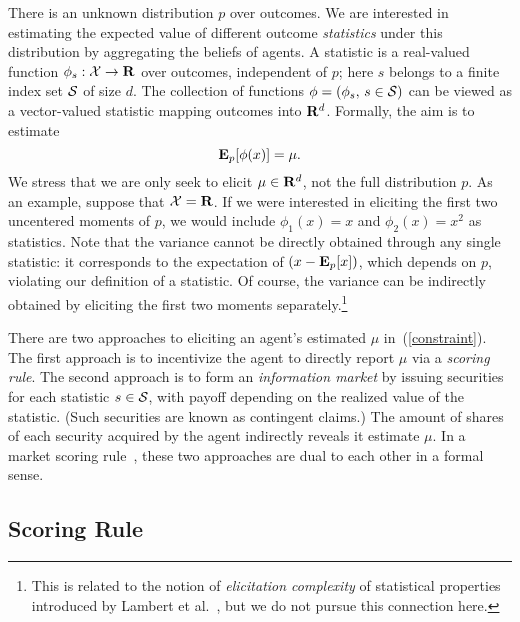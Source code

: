 There is an unknown distribution $p$ over outcomes. We are interested in estimating the expected value of different outcome \emph{statistics} under this distribution by aggregating the beliefs of agents. A statistic is a real-valued function $\phi_s : \mathcal{X} \rightarrow \mathbf{R}$ over outcomes, independent of $p$; here $s$ belongs to a finite index set $\mathcal{S}$ of size $d$. The collection of functions $\phi = (\phi_s,\, s \in \mathcal{S})$ can be viewed as a vector-valued statistic mapping outcomes into $\mathbf{R}^d$. Formally, the aim is to estimate
%
\begin{equation} \label{constraint}
\mathbf{E}_p[\phi(x)] = \mu.
\end{equation}
%
We stress that we are only seek to elicit $\mu \in \mathbf{R}^d$, not the full distribution $p$. As an example, suppose that $\mathcal{X} = \mathbf{R}$. If we were interested in eliciting the first two uncentered moments of $p$, we would include $\phi_1(x) = x$ and $\phi_2(x) = x^2$ as statistics. Note that the variance cannot be directly obtained through any single statistic: it corresponds to the expectation of $(x - \mathbf{E}_p[x])$, which depends on $p$, violating our definition of a statistic. Of course, the variance can be indirectly obtained by eliciting the first two moments separately.\footnote{This is related to the notion of \emph{elicitation complexity} of statistical properties introduced by Lambert et al.~\cite{Lambert}, but we do not pursue this connection here.}

There are two approaches to eliciting an agent's estimated $\mu$ in~(\ref{constraint}). The first approach is to incentivize the agent to directly report $\mu$ via a \emph{scoring rule}. The second approach is to form an \emph{information market} by issuing securities for each statistic $s \in \mathcal{S}$, with payoff depending on the realized value of the statistic. (Such securities are known as contingent claims.) The amount of shares of each security acquired by the agent indirectly reveals it estimate $\mu$. In a market scoring rule~\cite{Hanson}, these two approaches are dual to each other in a formal sense. 


\subsection{Scoring Rule}

